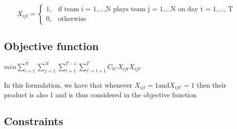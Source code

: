 \documentclass[12pt, letterpaper]{article}
\begin{document}
\begin{equation}
  X_{ijt} =\begin{cases}
    1, & \text{if team i = 1,...,N plays team j = 1,...N on day t = 1,..., T}\\
    0, & \text{otherwise}
  \end{cases}
\end{equation}

\subsection*{Objective function}
$min \sum_{i = 1}^{N}\sum_{j = 1}^{N}\sum_{t = 1}^{T-1} \sum_{t' = t+1}^{T} C_{tt'}X_{ijt}X_{ijt'}$

\hspace{1cm}

In this formulation, we have that whenever $X_{ijt} = 1 \text{and} X_{ijt'} = 1$ then their product is also 1 and is thus considered in the objective function

\subsection*{Constraints}
\end{document}
